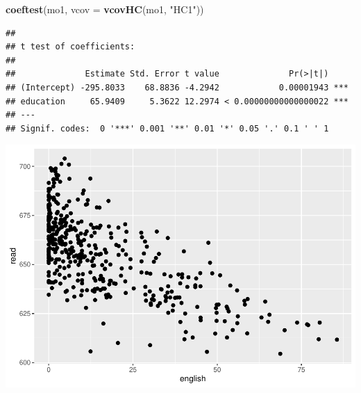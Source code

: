 \documentclass[
]{book}
\newenvironment{Shaded}{\begin{snugshade}}{\end{snugshade}}
\newcommand{\DataTypeTok}[1]{\textcolor[rgb]{0.13,0.29,0.53}{#1}}
\newcommand{\DecValTok}[1]{\textcolor[rgb]{0.00,0.00,0.81}{#1}}
\newcommand{\KeywordTok}[1]{\textcolor[rgb]{0.13,0.29,0.53}{\textbf{#1}}}
\newcommand{\NormalTok}[1]{#1}
\newcommand{\OperatorTok}[1]{\textcolor[rgb]{0.81,0.36,0.00}{\textbf{#1}}}
\newcommand{\StringTok}[1]{\textcolor[rgb]{0.31,0.60,0.02}{#1}}
\begin{document}
\begin{Shaded}
\begin{Highlighting}[]
\KeywordTok{coeftest}\NormalTok{(mo1, }\DataTypeTok{vcov =} \KeywordTok{vcovHC}\NormalTok{(mo1, }\StringTok{"HC1"}\NormalTok{))  }
\end{Highlighting}
\end{Shaded}

\begin{verbatim}
## 
## t test of coefficients:
## 
##              Estimate Std. Error t value              Pr(>|t|)    
## (Intercept) -295.8033    68.8836 -4.2942            0.00001943 ***
## education     65.9409     5.3622 12.2974 < 0.00000000000000022 ***
## ---
## Signif. codes:  0 '***' 0.001 '**' 0.01 '*' 0.05 '.' 0.1 ' ' 1
\end{verbatim}

\begin{Shaded}
\end{Shaded}

\includegraphics{Metrics_files/figure-latex/unnamed-chunk-22-2.pdf}
\end{document}
